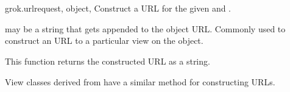   \section{}

    \begin{funcdesc}{grok.url}{request, object, }
    Construct a URL for the given  and .

     may be a string that gets appended to the object URL. Commonly
    used to construct an URL to a particular view on the object.

    This function returns the constructed URL as a string.

      \begin{seealso}
      View classes derived from  have a similar 
      method for constructing URLs.
      \end{seealso}
    \end{funcdesc}
